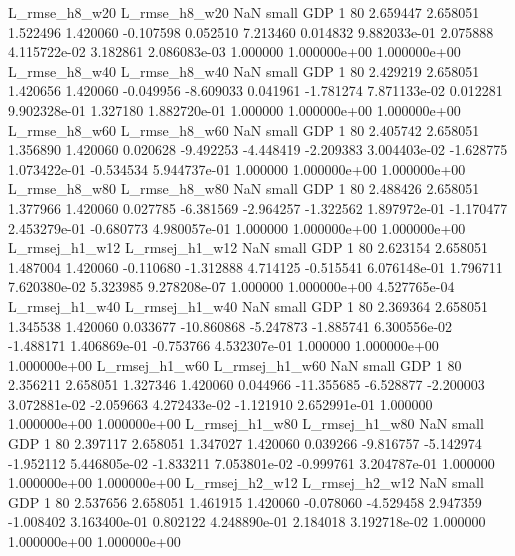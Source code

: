  L_rmse_h8_w20  L_rmse_h8_w20                   NaN      small      GDP                 1 80 2.659447       2.658051 1.522496       1.420060   -0.107598      0.052510      7.213460     0.014832   9.882033e-01  2.075888 4.115722e-02     3.182861   2.086083e-03            1.000000    1.000000e+00        1.000000e+00
 L_rmse_h8_w40  L_rmse_h8_w40                   NaN      small      GDP                 1 80 2.429219       2.658051 1.420656       1.420060   -0.049956     -8.609033      0.041961    -1.781274   7.871133e-02  0.012281 9.902328e-01     1.327180   1.882720e-01            1.000000    1.000000e+00        1.000000e+00
 L_rmse_h8_w60  L_rmse_h8_w60                   NaN      small      GDP                 1 80 2.405742       2.658051 1.356890       1.420060    0.020628     -9.492253     -4.448419    -2.209383   3.004403e-02 -1.628775 1.073422e-01    -0.534534   5.944737e-01            1.000000    1.000000e+00        1.000000e+00
 L_rmse_h8_w80  L_rmse_h8_w80                   NaN      small      GDP                 1 80 2.488426       2.658051 1.377966       1.420060    0.027785     -6.381569     -2.964257    -1.322562   1.897972e-01 -1.170477 2.453279e-01    -0.680773   4.980057e-01            1.000000    1.000000e+00        1.000000e+00
L_rmsej_h1_w12 L_rmsej_h1_w12                   NaN      small      GDP                 1 80 2.623154       2.658051 1.487004       1.420060   -0.110680     -1.312888      4.714125    -0.515541   6.076148e-01  1.796711 7.620380e-02     5.323985   9.278208e-07            1.000000    1.000000e+00        4.527765e-04
L_rmsej_h1_w40 L_rmsej_h1_w40                   NaN      small      GDP                 1 80 2.369364       2.658051 1.345538       1.420060    0.033677    -10.860868     -5.247873    -1.885741   6.300556e-02 -1.488171 1.406869e-01    -0.753766   4.532307e-01            1.000000    1.000000e+00        1.000000e+00
L_rmsej_h1_w60 L_rmsej_h1_w60                   NaN      small      GDP                 1 80 2.356211       2.658051 1.327346       1.420060    0.044966    -11.355685     -6.528877    -2.200003   3.072881e-02 -2.059663 4.272433e-02    -1.121910   2.652991e-01            1.000000    1.000000e+00        1.000000e+00
L_rmsej_h1_w80 L_rmsej_h1_w80                   NaN      small      GDP                 1 80 2.397117       2.658051 1.347027       1.420060    0.039266     -9.816757     -5.142974    -1.952112   5.446805e-02 -1.833211 7.053801e-02    -0.999761   3.204787e-01            1.000000    1.000000e+00        1.000000e+00
L_rmsej_h2_w12 L_rmsej_h2_w12                   NaN      small      GDP                 1 80 2.537656       2.658051 1.461915       1.420060   -0.078060     -4.529458      2.947359    -1.008402   3.163400e-01  0.802122 4.248890e-01     2.184018   3.192718e-02            1.000000    1.000000e+00        1.000000e+00
